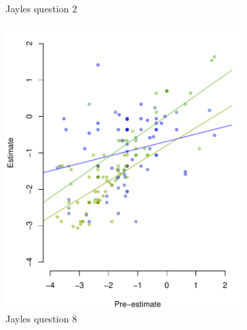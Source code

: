 \documentclass[10pt,a4paper,twocolumn,lineno]{article}
\begin{document}
\begin{figure}[htbp]
\begin{subfigure}[b]{.24\textwidth}
		\caption{Jayles question 2}
	\end{subfigure}
		\begin{subfigure}[b]{.24\textwidth}
		\includegraphics[width=\textwidth]{../plots/jayles8_vs_xp.pdf}
		\caption{Jayles question 8}
	\end{subfigure}
	\begin{subfigure}[b]{.24\textwidth}

\end{subfigure}
\end{figure}
\end{document}
